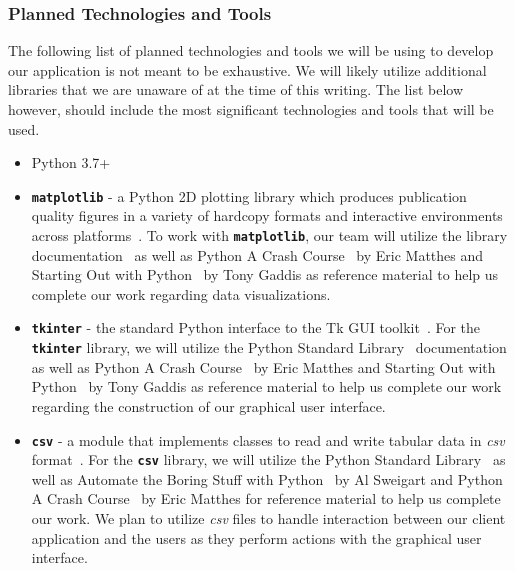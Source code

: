 \newpage

\subsubsection{Planned Technologies and Tools}
\label{sect:planned_tech_and_tools}

The following list of planned technologies and tools we will be using to develop our application is not meant to be exhaustive. We will likely utilize additional libraries that we are unaware of at the time of this writing. The list below however, should include the most significant technologies and tools that will be used.

\begin{itemize}
    \item {Python 3.7+}
    \item {\texttt{\textbf{matplotlib}} - a Python 2D plotting library which produces publication quality figures in a variety of hardcopy formats and interactive environments across platforms~\cite{MATPLOTLIB:4}. To work with {\texttt{\textbf{matplotlib}}, our team will utilize the library documentation~\cite{MATPLOTLIB:4} as well as Python A Crash Course~\cite{PYTHON_CRASH_COURSE:8} by Eric Matthes and Starting Out with Python~\cite{STARTING_OUT_WITH_PYTHON:9} by Tony Gaddis as reference material to help us complete our work regarding data visualizations.}}
    \item {\texttt{\textbf{tkinter}} - the standard Python interface to the Tk GUI toolkit~\cite{THE_PYTHON_STANDARD_LIBRARY:3}. For the \texttt{\textbf{tkinter}} library, we will utilize the Python Standard Library~\cite{THE_PYTHON_STANDARD_LIBRARY:3} documentation as well as Python A Crash Course~\cite{PYTHON_CRASH_COURSE:8} by Eric Matthes and Starting Out with Python~\cite{STARTING_OUT_WITH_PYTHON:9} by Tony Gaddis as reference material to help us complete our work regarding the construction of our graphical user interface. }
    \item {\texttt{\textbf{csv}} - a module that implements classes to read and write tabular data in \emph{csv} format~\cite{THE_PYTHON_STANDARD_LIBRARY:3}. For the {\texttt{\textbf{csv}}} library, we will utilize the Python Standard Library~\cite{THE_PYTHON_STANDARD_LIBRARY:3} as well as Automate the Boring Stuff with Python~\cite{PYTHON_AUTOMATE_THE_BORING_STUFF:10} by Al Sweigart and Python A Crash Course~\cite{PYTHON_CRASH_COURSE:8} by Eric Matthes for reference material to help us complete our work. We plan to utilize \emph{csv} files to handle interaction between our client application and the users as they perform actions with the graphical user interface.}

\end{itemize}
